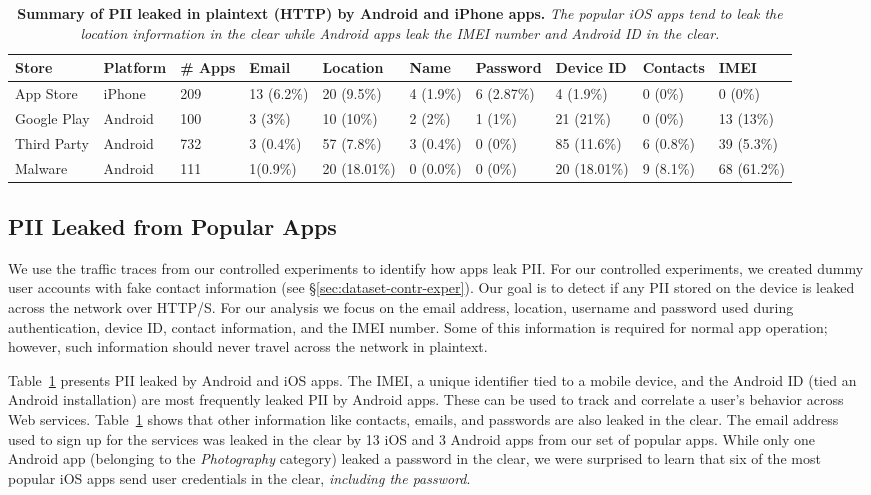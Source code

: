 \begin{table}[t]    
    \centering
    \begin{small}
    \begin{tabular}{|l|l|l|l|l|l|l|l|l|l|}
       \hline
       {\bf Store}&{\bf Platform}&{\bf \# Apps}&{\bf Email}& {\bf Location}& {\bf Name} &{\bf Password}& {\bf Device ID}& {\bf Contacts}& {\bf IMEI}\\
       \hline
       App Store&iPhone&209&13 (6.2\%) &20 (9.5\%)&4 (1.9\%)&6 (2.87\%)&4 (1.9\%)&0 (0\%)&0 (0\%)\\
       \hline
       Google Play&Android&100&3 (3\%)&10 (10\%)&2 (2\%)&1 (1\%)&21 (21\%)&0 (0\%)&13 (13\%)\\
       \hline
       Third Party&Android&732&3 (0.4\%)&57 (7.8\%)&3 (0.4\%)&0 (0\%)&85 (11.6\%)&6 (0.8\%)&39 (5.3\%)\\
       \hline
       Malware&Android&111&1(0.9\%)&20 (18.01\%)&0 (0.0\%)&0 (0\%)&20 (18.01\%)&9 (8.1\%)&68 (61.2\%)\\ 
       \hline  
    \end{tabular}
    \end{small}
    \caption{\textbf{Summary of PII leaked in plaintext (HTTP) by Android and iPhone apps.} \emph{The popular iOS apps tend to leak the location information in the clear while Android apps leak the IMEI number and Android ID in the clear.}}
    \vspace{\postfigspace}
    \label{tab:pii}
\end{table}

\subsection{PII Leaked from Popular Apps}
\label{subsec:exptpii}

We use the traffic traces from our controlled experiments to identify how apps leak PII. 
For our controlled experiments, we created dummy user accounts with fake contact information (see \S\ref{sec:dataset-contr-exper}).  
Our goal is to detect if any PII stored on the device is leaked across the network over HTTP/S.
For our analysis we focus on the email address, location, username and password used during authentication, device ID, contact information, and the IMEI number. 
Some of this information is required for normal app operation; however, such information should never travel across the network in plaintext.  

Table~\ref{tab:pii} presents PII leaked by Android and iOS apps. 
The IMEI, a unique identifier tied to a mobile device, and the Android ID (tied an Android installation) are most frequently leaked PII by Android apps.  
These can be used to track and correlate a user's behavior across Web services. 
Table~\ref{tab:pii} shows that other information like contacts, emails, and passwords are also leaked in the clear. 
The email address used to sign up for the services was leaked in the clear by 13 iOS and 3 Android apps from our set of popular apps.
While only one Android app (belonging to the \emph{Photography} category) leaked a password in the clear, we were surprised to learn that six of the most popular iOS apps send user credentials in the clear, \emph{including the password}. 

